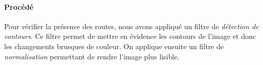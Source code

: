 	\paragraph{Procédé}	
		Pour vérifier la présence des routes, nous avons appliqué un filtre de \emph{détection de contours}. Ce filtre permet de mettre en évidence les contours de l'image et donc les changements brusques de couleur. On applique ensuite un filtre de \emph{normalisation} permettant de rendre l'image plus lisible.